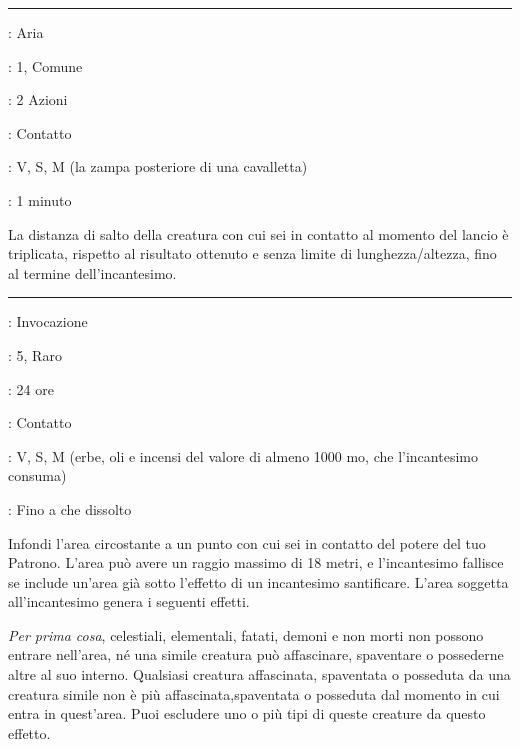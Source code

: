 \begin{multicols}{2}
\smallskip\noindent\rule{\linewidth}{2pt} \hypertarget{Saltare}{}\smallskip{}
\noindent
\begin{description}[noitemsep, topsep=0pt, parsep=0pt, partopsep=0pt, leftmargin=0cm, labelwidth=2.8cm]
	\item[\textbf{Lista di Magia}]: Aria
	\item[\textbf{Livello}]: 1, Comune
	\item[\textbf{T. di Lancio}]: 2 Azioni
	\item[\textbf{Gittata}]: Contatto
	\item[\textbf{Componenti}]: V, S, M (la zampa posteriore di una cavalletta)
	\item[\textbf{Durata}]: 1 minuto
\end{description}

La distanza di salto della creatura con cui sei in contatto al momento del lancio è triplicata, rispetto al risultato ottenuto e senza limite di lunghezza/altezza, fino al termine dell'incantesimo.

\smallskip\noindent\rule{\linewidth}{2pt} \hypertarget{Santificare}{}\smallskip{}
\noindent
\begin{description}[noitemsep, topsep=0pt, parsep=0pt, partopsep=0pt, leftmargin=0cm, labelwidth=2.8cm]
	\item[\textbf{Lista di Magia}]: Invocazione
	\item[\textbf{Livello}]: 5, Raro
	\item[\textbf{T. di Lancio}]: 24 ore
	\item[\textbf{Gittata}]: Contatto
	\item[\textbf{Componenti}]: V, S, M (erbe, oli e incensi del valore di almeno 1000 mo, che l'incantesimo consuma)
	\item[\textbf{Durata}]: Fino a che dissolto
\end{description}

Infondi l'area circostante a un punto con cui sei in contatto del potere del tuo Patrono. L'area può avere un raggio massimo di 18 metri, e l'incantesimo fallisce se include un'area già sotto l'effetto di un incantesimo santificare. L'area soggetta all'incantesimo genera i seguenti effetti.

\emph{Per prima cosa}, celestiali, elementali, fatati, demoni e non morti non possono entrare nell'area, né una simile creatura può affascinare, spaventare o possederne altre al suo interno. Qualsiasi creatura affascinata, spaventata o posseduta da una creatura simile non è più affascinata,spaventata o posseduta dal momento in cui entra in quest'area. Puoi escludere uno o più tipi di queste creature da questo effetto.


\end{multicols}
